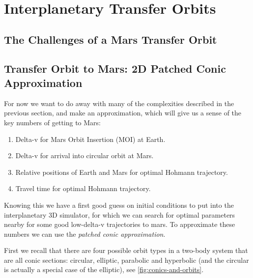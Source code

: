 \section{Interplanetary Transfer Orbits}

\subsection{The Challenges of a Mars Transfer Orbit}

\subsection{Transfer Orbit to Mars: 2D Patched Conic Approximation} \label{sec:2d-patched-conic}
For now we want to do away with many of the complexities described in the previous section, and make an approximation, which will give us a sense of the key numbers of getting to Mars:
\begin{enumerate}
	\item Delta-v for Mars Orbit Insertion (MOI) at Earth.
	\item Delta-v for arrival into circular orbit at Mars.
	\item Relative positions of Earth and Mars for optimal Hohmann trajectory.
	\item Travel time for optimal Hohmann trajectory.
\end{enumerate}

Knowing this we have a first good guess on initial conditions to put into the interplanetary 3D simulator, for which we can search for optimal parameters nearby for some good low-delta-v trajectories to mars. To approximate these numbers we can use the \emph{patched conic approximation}.

First we recall that there are four possible orbit types in a two-body system that are all conic sections: circular, elliptic, parabolic and hyperbolic (and the circular is actually a special case of the elliptic), see \cref{fig:conics-and-orbits}.

